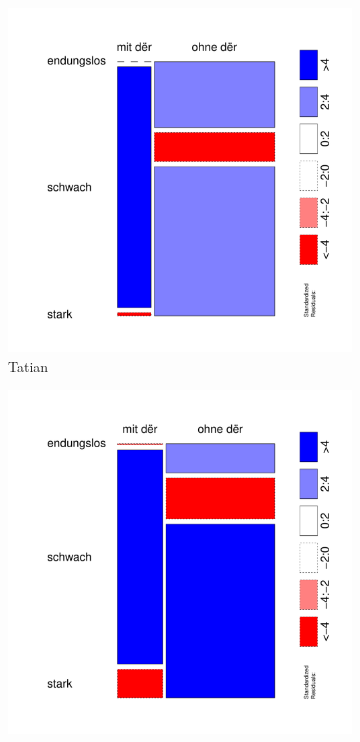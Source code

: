 \begin{figure}
\begin{subfigure}[b]{.5\linewidth}
  \includegraphics[height=.25\textheight]{generated/images/adjektive-T}
\caption {Tatian}
\end{subfigure}%
\begin{subfigure}[b]{.5\linewidth}
  \includegraphics[height=.25\textheight]{generated/images/adjektive-O}

\end{subfigure}
\end{figure}
